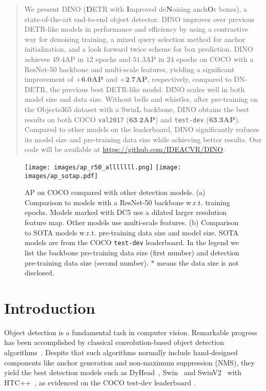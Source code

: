 \documentclass[runningheads]{llncs}
\newcommand{\modelname}{{DINO}}
\begin{document}
\begin{abstract}
We present  {\modelname} (\textbf{D}ETR with \textbf{I}mproved de\textbf{N}oising anch\textbf{O}r boxes), a state-of-the-art end-to-end object detector. DINO improves over previous DETR-like models in performance and efficiency by using a contrastive way for denoising training, a mixed query selection method for anchor initialization, and a look forward twice scheme for box prediction.
DINO achieves $49.4$AP in $12$ epochs and $51.3$AP in $24$ epochs on COCO with a ResNet-50 backbone and multi-scale features, yielding a significant improvement of $\textbf{+6.0}$\textbf{AP} and $\textbf{+2.7}$\textbf{AP}, respectively, compared to DN-DETR, the previous best DETR-like model. DINO scales well in both model size and data size. Without bells and whistles, after pre-training on the Objects365 dataset with a SwinL backbone, DINO obtains the best results on both COCO \texttt{val2017} ($\textbf{63.2}$\textbf{AP}) and \texttt{test-dev} (\textbf{$\textbf{63.3}$AP}). Compared to other models on the leaderboard, DINO significantly reduces its model size and pre-training data size while achieving better results. Our code will be available at \url{https://github.com/IDEACVR/DINO}.


\end{abstract}

\begin{figure}[ht]
    \centering
    \begin{center}
\texttt{[image: images/ap\_r50\_alllllll.png]}
\texttt{[image: images/ap\_sotap.pdf]}
\vspace{-0.4cm}
\end{center}
    \caption{AP on COCO compared with other detection models. (a) Comparison to models with a ResNet-50 backbone w.r.t. training epochs. Models marked with DC5 use a dilated larger resolution feature map. Other models use multi-scale features. (b) Comparison to SOTA models w.r.t. pre-training data size and model size. SOTA models are from the COCO  \texttt{test-dev} leaderboard. In the legend we list the backbone pre-training data size (first number) and detection pre-training data size (second number). $*$ means the data size is not disclosed.
}
    \label{fig:intro}
\end{figure}
 

\section{Introduction}
Object detection is a fundamental task in computer vision. Remarkable progress has been accomplished by classical convolution-based object detection algorithms~\cite{RenHG017,tian2019fcos,lin2018focal,bochkovskiy2020yolov4,ge2021yolox}. Despite that such algorithms normally include hand-designed components like anchor generation and non-maximum suppression (NMS), they yield the best detection models such as DyHead~\cite{dai2021dynamic}, Swin~\cite{liu2021swin} and SwinV2~\cite{liu2021swinv2} with HTC++~\cite{chen2019hybrid}, as evidenced on the COCO test-dev leaderboard \cite{paperwithcode}.
\end{document}
